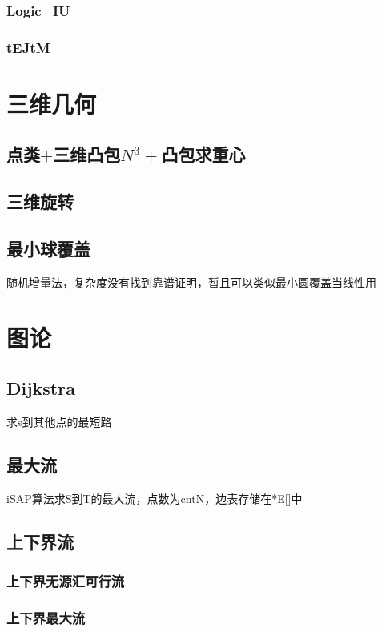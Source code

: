 \documentclass[a4paper,10pt]{book}
\begin{document}
		\subsection{Logic\_IU}
			
		\subsection{tEJtM}
			

\chapter{三维几何}
	\section{点类$+$三维凸包$N^3+$凸包求重心}
		
	\section{三维旋转}
		
	\section{最小球覆盖}
		随机增量法，复杂度没有找到靠谱证明，暂且可以类似最小圆覆盖当线性用
		
		
\chapter{图论}
    \section{Dijkstra}
	    求s到其他点的最短路
	    

	\section{最大流}
	    iSAP算法求S到T的最大流，点数为cntN，边表存储在*E[]中
	    

	\section{上下界流}
		\subsection{上下界无源汇可行流}
			
		\subsection{上下界最大流}
			
\end{document}
